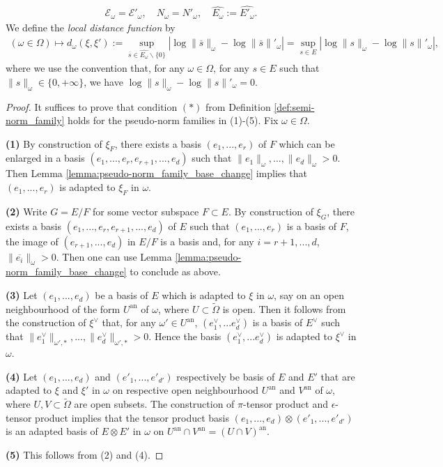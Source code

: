 \documentclass [11pt,reqno]{amsart}
\newcommand{\1}{\mathmybb{1}}
\def\cE{{\mathcal{E}}}
\def\an{\operatorname{an}}
\def\tilde{\widetilde}
\def\setminus{\smallsetminus}
\begin{document}
\begin{proposition-definition}
\begin{itemize}
	\begin{align*}
	\cE_{\omega}=\cE'_{\omega},\quad N_{\omega}=N'_{\omega},\quad \widehat{E_{\omega}} := \widehat{E'_{\omega}}.
	\end{align*}
	We define the \emph{local distance function} by
	\begin{align*}
	(\omega\in\Omega) \mapsto d_{\omega}(\xi,\xi') := \displaystyle\sup_{\overline{s}\in \widehat{E_{\omega}}\setminus\{0\}} \left|\log \|\overline{s}\|_{\omega}-\log\|\overline{s}\|'_{\omega}\right| = \sup_{s\in E} \left|\log \|s\|_{\omega}-\log\|s\|'_{\omega}\right|,
	\end{align*}
	where we use the convention that, for any $\omega\in\Omega$, for any $s\in E$ such that $\|s\|_{\omega}\in\{0,+\infty\}$, we have $\log \|s\|_{\omega}-\log\|s\|'_{\omega}=0$.
\end{itemize}
\end{proposition-definition}

\begin{proof}
It suffices to prove that condition $(\ast)$ from Definition \ref{def:semi-norm_family} holds for the pseudo-norm families in (1)-(5). Fix $\omega \in \Omega$.

\textbf{(1)} By construction of $\xi_F$, there exists a basis $(e_1,...,e_r)$ of $F$ which can be enlarged in a basis $(e_1,...,e_r,e_{r+1},...,e_d)$ such that $\|e_1\|_{\omega},...,\|e_d\|_{\omega}>0$. Then Lemma \ref{lemma:pseudo-norm_family_base_change} implies that $(e_1,...,e_r)$ is adapted to $\xi_{F}$ in $\omega$.

\textbf{(2)} Write $G = E/F$ for some vector subspace $F\subset E$. By construction of $\xi_G$, there exists a basis $(e_1,...,e_r,e_{r+1},...,e_{d})$ of $E$ such that $(e_1,...,e_r)$ is a basis of $F$, the image of $(e_{r+1},...,e_{d})$ in $E/F$ is a basis and, for any $i=r+1,...,d$, $\|\overline{e_{i}}\|_{\omega} >0$. Then one can use Lemma \ref{lemma:pseudo-norm_family_base_change} to conclude as above. 

\textbf{(3)} Let $(e_1,...,e_d)$ be a basis of $E$ which is adapted to $\xi$ in $\omega$, say on an open neighbourhood of the form $U^{\an}$ of $\omega$, where $U\subset \tilde{\Omega}$ is open. Then it follows from the construction of $\xi^{\vee}$ that, for any $\omega'\in U^{\an}$, $(e_1^{\vee},...e_{d}^{\vee})$ is a basis of $E^{\vee}$ such that $\|e_1^{\vee}\|_{\omega',\ast},...,\|e_d^{\vee}\|_{\omega',\ast}>0$. Hence the basis $(e_1^{\vee},...e_{d}^{\vee})$ is adapted to $\xi^{\vee}$ in $\omega$. 

\textbf{(4)} Let $(e_1,...,e_d)$ and $(e'_1,...,e'_{d'})$ respectively be basis of $E$ and $E'$ that are adapted to $\xi$ and $\xi'$ in $\omega$ on respective open neighbourhood $U^{\an}$ and $V^{\an}$ of $\omega$, where $U,V\subset \tilde{\Omega}$ are open subsets. The construction of $\pi$-tensor product and $\epsilon$-tensor product implies that the tensor product basis $(e_1,...,e_d)\otimes (e'_{1},...,e'_{d'})$ is an adapted basis of $E \otimes E'$ in $\omega$ on $U^{\an} \cap V^{\an}=(U\cap V)^{\an}$.

\textbf{(5)} This follows from (2) and (4).
\end{proof}
\end{document}
